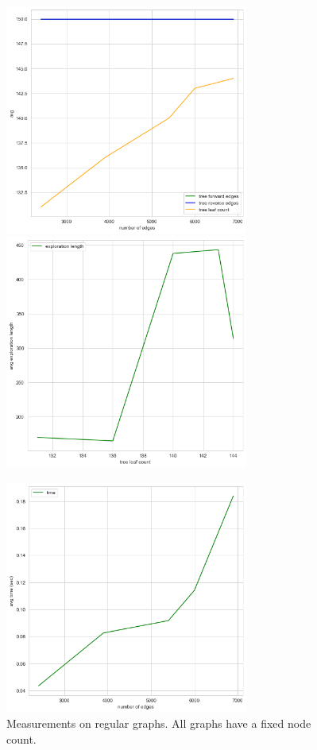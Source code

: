 \documentclass{article}
\begin{document}
\begin{figure}
  \includegraphics[width=8cm]{figures/reg_uj/edge_tree.png}
  \hspace{1cm}
  \includegraphics[width=8cm]{figures/reg_uj/leaf_expl.png}
  \vspace{1cm}

  \includegraphics[width=8cm]{figures/reg_uj/edge_time.png}

  \caption{Measurements on regular graphs. All graphs have a fixed node count.}
  \label{fig:regular-results}
\end{figure}
\end{document}
